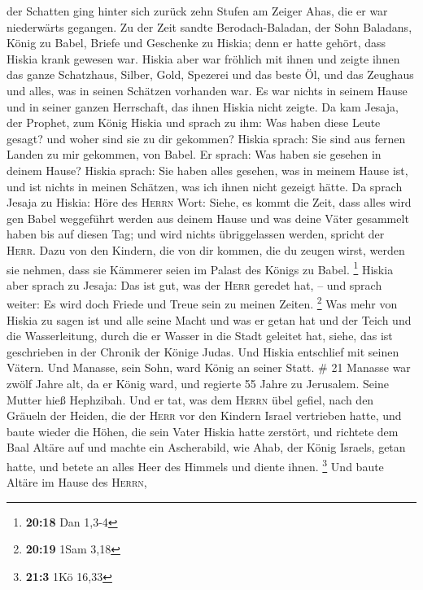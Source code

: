 der Schatten ging hinter sich zurück zehn Stufen am Zeiger Ahas, die er
war niederwärts gegangen.  Zu der Zeit sandte
Berodach-Baladan, der Sohn Baladans, König zu Babel, Briefe und
Geschenke zu Hiskia; denn er hatte gehört, dass Hiskia krank gewesen
war.  Hiskia aber war fröhlich mit ihnen und zeigte ihnen
das ganze Schatzhaus, Silber, Gold, Spezerei und das beste Öl, und das
Zeughaus und alles, was in seinen Schätzen vorhanden war. Es war nichts
in seinem Hause und in seiner ganzen Herrschaft, das ihnen Hiskia nicht
zeigte.  Da kam Jesaja, der Prophet, zum König Hiskia und
sprach zu ihm: Was haben diese Leute gesagt? und woher sind sie zu dir
gekommen? Hiskia sprach: Sie sind aus fernen Landen zu mir gekommen, von
Babel.  Er sprach: Was haben sie gesehen in deinem Hause?
Hiskia sprach: Sie haben alles gesehen, was in meinem Hause ist, und ist
nichts in meinen Schätzen, was ich ihnen nicht gezeigt hätte.
 Da sprach Jesaja zu Hiskia: Höre des \textsc{Herrn}
Wort:  Siehe, es kommt die Zeit, dass alles wird gen
Babel weggeführt werden aus deinem Hause und was deine Väter gesammelt
haben bis auf diesen Tag; und wird nichts übriggelassen werden, spricht
der \textsc{Herr}.  Dazu von den Kindern, die von dir
kommen, die du zeugen wirst, werden sie nehmen, dass sie Kämmerer seien
im Palast des Königs zu Babel. \footnote{\textbf{20:18} Dan 1,3-4}
 Hiskia aber sprach zu Jesaja: Das ist gut, was der
\textsc{Herr} geredet hat, -- und sprach weiter: Es wird doch Friede und
Treue sein zu meinen Zeiten. \footnote{\textbf{20:19} 1Sam 3,18}
 Was mehr von Hiskia zu sagen ist und alle seine Macht
und was er getan hat und der Teich und die Wasserleitung, durch die er
Wasser in die Stadt geleitet hat, siehe, das ist geschrieben in der
Chronik der Könige Judas.  Und Hiskia entschlief mit
seinen Vätern. Und Manasse, sein Sohn, ward König an seiner Statt. \# 21
 Manasse war zwölf Jahre alt, da er König ward, und
regierte 55 Jahre zu Jerusalem. Seine Mutter hieß Hephzibah.
 Und er tat, was dem \textsc{Herrn} übel gefiel, nach den
Gräueln der Heiden, die der \textsc{Herr} vor den Kindern Israel
vertrieben hatte,  und baute wieder die Höhen, die sein
Vater Hiskia hatte zerstört, und richtete dem Baal Altäre auf und machte
ein Ascherabild, wie Ahab, der König Israels, getan hatte, und betete an
alles Heer des Himmels und diente ihnen. \footnote{\textbf{21:3} 1Kö
  16,33}  Und baute Altäre im Hause des \textsc{Herrn},
